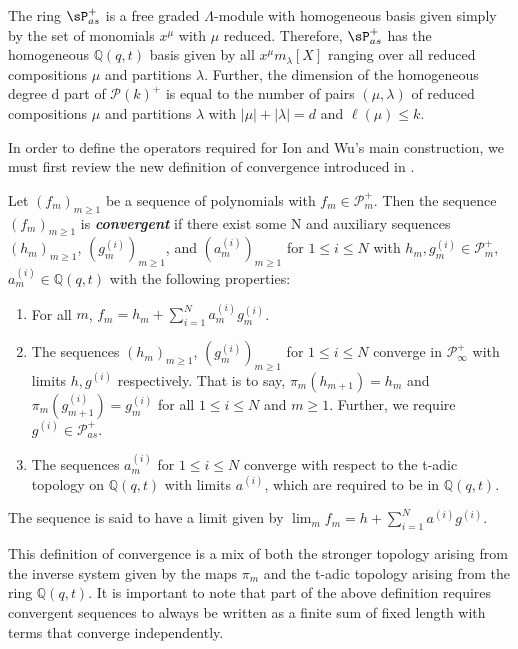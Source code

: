The ring $\sP_{as}^{+}$ is a free graded $\Lambda$-module with homogeneous basis given simply by the set of monomials $x^{\mu}$ with $\mu$ reduced. Therefore, $\sP_{as}^{+}$ has the homogeneous $\mathbb{Q}(q,t)$ basis given by all $x^{\mu}m_{\lambda}[X]$ ranging over all reduced compositions $\mu$ and partitions $\lambda$. Further, the dimension of the homogeneous degree d part of $\mathscr{P}(k)^{+}$ is equal to the number of pairs $(\mu,\lambda)$ of reduced compositions $\mu$ and partitions $\lambda$ with $|\mu|+|\lambda| = d$ and $\ell(\mu) \leq k$. 
 
In order to define the operators required for Ion and Wu's main construction, we must first review the new definition of convergence introduced in \cite{Ion_2022}. 

 \begin{defi}\label{defn6}
 Let $(f_m)_{m \geq 1}$ be a sequence of polynomials with $f_m \in \mathscr{P}_m^{+}$. Then the sequence $(f_m)_{m \geq 1}$ is \textbf{\textit{convergent}} if there exist some N and auxiliary sequences $(h_m)_{m\geq1}$, $(g^{(i)}_m)_{m\geq 1}$, and $(a^{(i)}_m)_{m\geq 1}$ for $1\leq i \leq N$ with $h_m, g^{(i)}_m \in \mathscr{P}_{m}^{+}$, $a^{(i)}_m \in \mathbb{Q}(q,t)$ with the following properties:

\begin{enumerate}
    \item For all $m$, $f_m = h_m + \sum_{i=1}^{N} a^{(i)}_m g^{(i)}_m$.
    \item The sequences $(h_m)_{m\geq1}$, $(g^{(i)}_m)_{m\geq1}$ for $1\leq i \leq N$ converge in $\mathscr{P}_{\infty}^{+}$ with limits $h,g^{(i)}$ respectively. That is to say, $\pi_m(h_{m+1}) = h_m$ and $\pi_m(g_{m+1}^{(i)}) = g_{m}^{(i)}$ for all $1\leq i \leq N$ and $m \geq 1$. Further, we require $g^{(i)} \in \mathscr{P}_{as}^{+}$.
    \item The sequences $a^{(i)}_m$ for $1\leq i \leq N$ converge with respect to the t-adic topology on $\mathbb{Q}(q,t)$ with limits $a^{(i)}$, which are required to be in $\mathbb{Q}(q,t)$.
\end{enumerate}

The sequence is said to have a limit given by
$\lim_{m} f_m = h + \sum_{i=1}^{N}a^{(i)}g^{(i)}.$

\end{defi}

This definition of convergence is a mix of both the stronger topology arising from the inverse system given by the maps $\pi_m$ and the t-adic topology arising from the ring $\mathbb{Q}(q,t)$. It is important to note that part of the above definition requires convergent sequences to always be written as a finite sum of fixed length with terms that converge independently. 

